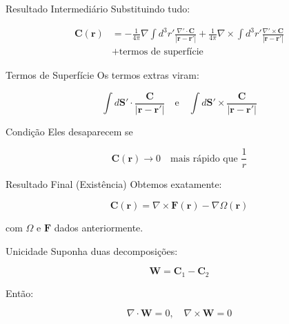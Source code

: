 \documentclass[aspectratio=169]{beamer}
\begin{document}
\begin{frame}{Resultado Intermediário}
Substituindo tudo:

\begin{align}
\mathbf{C}(\mathbf{r}) &= 
-\frac{1}{4\pi} \nabla \int d^3 r' \frac{\nabla' \cdot \mathbf{C}}{|\mathbf{r}-\mathbf{r}'|}
+ \frac{1}{4\pi} \nabla \times \int d^3 r' \frac{\nabla' \times \mathbf{C}}{|\mathbf{r}-\mathbf{r}'|} \\
&+ \text{termos de superfície}
\end{align}
\end{frame}

\begin{frame}{Termos de Superfície}
Os termos extras viram:

\begin{equation}
\int d\mathbf{S}' \cdot \frac{\mathbf{C}}{|\mathbf{r}-\mathbf{r}'|}
\quad \text{e} \quad
\int d\mathbf{S}' \times \frac{\mathbf{C}}{|\mathbf{r}-\mathbf{r}'|}
\end{equation}

\begin{block}{Condição}
Eles desaparecem se

\begin{equation}
\mathbf{C}(\mathbf{r}) \to 0 \quad \text{mais rápido que } \frac{1}{r}
\end{equation}
\end{block}
\end{frame}

\begin{frame}{Resultado Final (Existência)}
Obtemos exatamente:

\begin{equation}
\mathbf{C}(\mathbf{r}) =
\nabla \times \mathbf{F}(\mathbf{r}) - \nabla \Omega(\mathbf{r})
\end{equation}

com $\Omega$ e $\mathbf{F}$ dados anteriormente.
\end{frame}

\begin{frame}{Unicidade}
Suponha duas decomposições:

\begin{equation}
\mathbf{W} = \mathbf{C}_1 - \mathbf{C}_2
\end{equation}

Então:

\begin{equation}
\nabla \cdot \mathbf{W} = 0,
\quad
\nabla \times \mathbf{W} = 0
\end{equation}
\end{frame}
\end{document}
